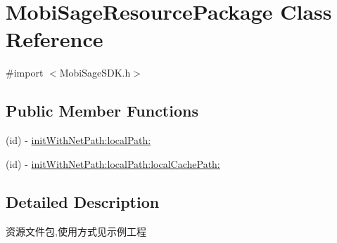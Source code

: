 \hypertarget{interface_mobi_sage_resource_package}{\section{\-Mobi\-Sage\-Resource\-Package \-Class \-Reference}
\label{interface_mobi_sage_resource_package}
}


{\ttfamily \#import $<$\-Mobi\-Sage\-S\-D\-K.\-h$>$}

\subsection*{\-Public \-Member \-Functions}
\begin{DoxyCompactItemize}
\item 
(id) -\/ \hyperlink{interface_mobi_sage_resource_package_a5cad3fd48c9d7a259dc7ec2df3b4510d}{init\-With\-Net\-Path\-:local\-Path\-:}
\item 
(id) -\/ \hyperlink{interface_mobi_sage_resource_package_a022e2a8cdf25bfab0d70848d8dc592d2}{init\-With\-Net\-Path\-:local\-Path\-:local\-Cache\-Path\-:}
\end{DoxyCompactItemize}


\subsection{\-Detailed \-Description}
资源文件包,使用方式见示例工程 

